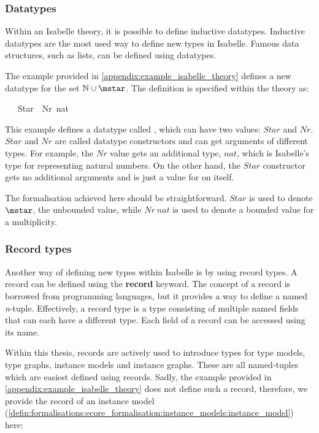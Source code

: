 \subsubsection{Datatypes}
Within an Isabelle theory, it is possible to define inductive datatypes. Inductive datatypes are the most used way to define new types in Isabelle. Famous data structures, such as lists, can be defined using datatypes.

The example provided in \cref{appendix:example_isabelle_theory} defines a new datatype for the set $\mathbb{N} \cup {\mstar}$. The definition is specified within the theory as:
\vspace{1em}\begin{isabellebody}
\isamarkupfalse%
\ {\isasymM}\ {\isacharequal}\ Star\ {\isacharbar}\ Nr\ nat\isanewline
\end{isabellebody}

This example defines a datatype called \isasymM{}, which can have two values: $Star$ and $Nr$. $Star$ and $Nr$ are called datatype constructors and can get arguments of different types. For example, the $Nr$ value gets an additional type, $nat$, which is Isabelle's type for representing natural numbers. On the other hand, the $Star$ constructor gets no additional arguments and is just a value for \isasymM{} on itself.

The formalisation achieved here should be straightforward. $Star$ is used to denote $\mstar$, the unbounded value, while $Nr\ nat$ is used to denote a bounded value for a multiplicity.

\subsubsection{Record types}
Another way of defining new types within Isabelle is by using record types. A record can be defined using the \textbf{record} keyword. The concept of a record is borrowed from programming languages, but it provides a way to define a named \textit{n}-tuple. Effectively, a record type is a type consisting of multiple named fields that can each have a different type. Each field of a record can be accessed using its name.

Within this thesis, records are actively used to introduce types for type models, type graphs, instance models and instance graphs. These are all named-tuples which are easiest defined using records. Sadly, the example provided in \cref{appendix:example_isabelle_theory} does not define such a record, therefore, we provide the record of an instance model (\cref{defin:formalisations:ecore_formalisation:instance_models:instance_model}) here:

